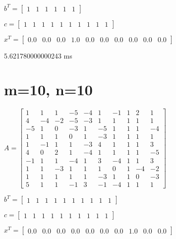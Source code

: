 \documentclass[8pt]{article}
\begin{document}
$ b^T =
\begin{bmatrix}
  1  &  1  &  1  &  1  &  1  &  1 
\end{bmatrix}
$


$ c =
\begin{bmatrix}
  1  &  1  &  1  &  1  &  1  &  1  &  1  &  1  &  1  &  1 
\end{bmatrix}
$


$ x^T =
\begin{bmatrix}
  0.0 &  0.0 &  0.0 &  1.0 &  0.0 &  0.0 &  0.0 &  0.0 &  0.0 &  0.0
\end{bmatrix}
$


5.621780000000243  ms


\section{ m=10, n=10 }



$ A =
\begin{bmatrix}
  1  &  1  &  1  & -5  & -4  &  1  & -1  &  1  &  2  &  1 \\
  4  & -4  & -2  & -5  & -3  &  1  &  1  &  1  &  1  &  1 \\
 -5  &  1  &  0  & -3  &  1  & -5  &  1  &  1  &  1  & -4 \\
  1  &  1  &  1  &  0  &  1  & -3  &  1  &  1  &  1  &  1 \\
  1  & -1  &  1  &  1  & -3  &  4  &  1  &  1  &  1  &  3 \\
  4  &  0  &  2  &  1  & -4  &  1  &  1  &  1  &  1  & -5 \\
 -1  &  1  &  1  & -4  &  1  &  3  & -4  &  1  &  1  &  3 \\
  1  &  1  & -3  &  1  &  1  &  1  &  0  &  1  & -4  & -2 \\
  1  &  1  &  1  &  1  &  1  & -3  &  1  &  1  &  0  & -3 \\
  5  &  1  &  1  & -1  &  3  & -1  & -4  &  1  &  1  &  1 
\end{bmatrix}
$


$ b^T =
\begin{bmatrix}
  1  &  1  &  1  &  1  &  1  &  1  &  1  &  1  &  1  &  1 
\end{bmatrix}
$


$ c =
\begin{bmatrix}
  1  &  1  &  1  &  1  &  1  &  1  &  1  &  1  &  1  &  1 
\end{bmatrix}
$


$ x^T =
\begin{bmatrix}
  0.0 &  0.0 &  0.0 &  0.0 &  0.0 &  0.0 &  0.0 &  1.0 &  0.0 &  0.0
\end{bmatrix}
$
\end{document}
